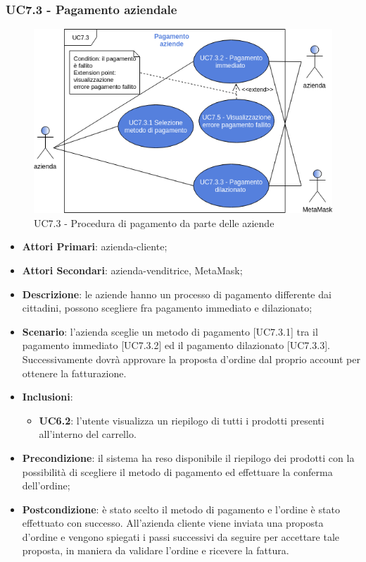 \subsubsection{UC7.3 - Pagamento aziendale}
\begin{figure}[H]
	\includegraphics[width=14cm]{res/images/UC7-PagamentoAzienda.png}
	\centering
	\caption{UC7.3 - Procedura di pagamento da parte delle aziende}
\end{figure}
\begin{itemize}
	\item \textbf{Attori Primari}: azienda-cliente;
	\item \textbf{Attori Secondari}: azienda-venditrice, MetaMask\glo;
	\item \textbf{Descrizione}: le aziende hanno un processo di pagamento differente dai cittadini, possono scegliere fra pagamento immediato e dilazionato\glo;
	\item \textbf{Scenario}: l'azienda sceglie un metodo di pagamento [UC7.3.1] tra il pagamento immediato [UC7.3.2] ed il pagamento dilazionato [UC7.3.3]. Successivamente dovrà approvare la proposta d'ordine dal proprio account per ottenere la fatturazione.
	\item \textbf{Inclusioni}: 
	\begin{itemize}
		\item \textbf{UC6.2}: l'utente visualizza un riepilogo di tutti i prodotti presenti all'interno del carrello.
	\end{itemize}
	\item \textbf{Precondizione}: il sistema ha reso disponibile il riepilogo dei prodotti con la possibilità di scegliere il metodo di pagamento ed effettuare la conferma dell'ordine;
	\item \textbf{Postcondizione}: è stato scelto il metodo di pagamento e l'ordine è stato effettuato con successo. All'azienda cliente viene inviata una proposta d'ordine e vengono spiegati i passi successivi da seguire per accettare tale proposta, in maniera da validare l'ordine e ricevere la fattura.
\end{itemize} 

